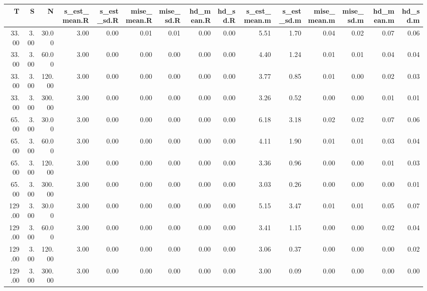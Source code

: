 \begin{table}[ht]
\centering
\begin{tabular}{rrrrrrrrrrrrrrr}
  \hline
T & S & N & s\_est\_mean.R & s\_est\_sd.R & mise\_mean.R & mise\_sd.R & hd\_mean.R & hd\_sd.R & s\_est\_mean.m & s\_est\_sd.m & mise\_mean.m & mise\_sd.m & hd\_mean.m & hd\_sd.m \\ 
  \hline
33.00 & 3.00 & 30.00 & 3.00 & 0.00 & 0.01 & 0.01 & 0.00 & 0.00 & 5.51 & 1.70 & 0.04 & 0.02 & 0.07 & 0.06 \\ 
  33.00 & 3.00 & 60.00 & 3.00 & 0.00 & 0.00 & 0.00 & 0.00 & 0.00 & 4.40 & 1.24 & 0.01 & 0.01 & 0.04 & 0.04 \\ 
  33.00 & 3.00 & 120.00 & 3.00 & 0.00 & 0.00 & 0.00 & 0.00 & 0.00 & 3.77 & 0.85 & 0.01 & 0.00 & 0.02 & 0.03 \\ 
  33.00 & 3.00 & 300.00 & 3.00 & 0.00 & 0.00 & 0.00 & 0.00 & 0.00 & 3.26 & 0.52 & 0.00 & 0.00 & 0.01 & 0.01 \\ 
  65.00 & 3.00 & 30.00 & 3.00 & 0.00 & 0.00 & 0.00 & 0.00 & 0.00 & 6.18 & 3.18 & 0.02 & 0.02 & 0.07 & 0.06 \\ 
  65.00 & 3.00 & 60.00 & 3.00 & 0.00 & 0.00 & 0.00 & 0.00 & 0.00 & 4.11 & 1.90 & 0.01 & 0.01 & 0.03 & 0.04 \\ 
  65.00 & 3.00 & 120.00 & 3.00 & 0.00 & 0.00 & 0.00 & 0.00 & 0.00 & 3.36 & 0.96 & 0.00 & 0.00 & 0.01 & 0.03 \\ 
  65.00 & 3.00 & 300.00 & 3.00 & 0.00 & 0.00 & 0.00 & 0.00 & 0.00 & 3.03 & 0.26 & 0.00 & 0.00 & 0.00 & 0.01 \\ 
  129.00 & 3.00 & 30.00 & 3.00 & 0.00 & 0.00 & 0.00 & 0.00 & 0.00 & 5.15 & 3.47 & 0.01 & 0.01 & 0.05 & 0.07 \\ 
  129.00 & 3.00 & 60.00 & 3.00 & 0.00 & 0.00 & 0.00 & 0.00 & 0.00 & 3.41 & 1.15 & 0.00 & 0.00 & 0.02 & 0.04 \\ 
  129.00 & 3.00 & 120.00 & 3.00 & 0.00 & 0.00 & 0.00 & 0.00 & 0.00 & 3.06 & 0.37 & 0.00 & 0.00 & 0.00 & 0.02 \\ 
  129.00 & 3.00 & 300.00 & 3.00 & 0.00 & 0.00 & 0.00 & 0.00 & 0.00 & 3.00 & 0.09 & 0.00 & 0.00 & 0.00 & 0.00 \\ 
   \hline
\end{tabular}
\end{table}

